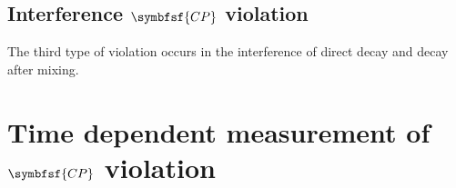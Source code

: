 \subsection[head={Interference \CP violation},tocentry={Interference \CP violation}]{Interference $\symbfsf{C{}P}$ violation}
\label{sec:InterferenceCPV}

The third type of \CP violation occurs in the interference of direct decay and decay after mixing.

\section[head={Time dependent measurement of \CP violation},tocentry={Time dependent measurement of \CP violation}]
{Time dependent measurement of $\symbfsf{C{}P}$ violation}
\label{sec:TimeDependentCPV}

